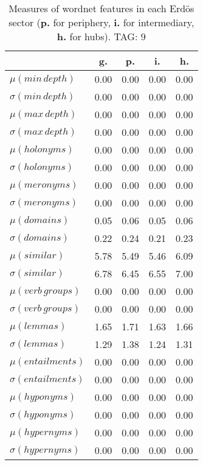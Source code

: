 \begin{table}[h!]
\begin{center}
\begin{tabular}{| l | c | c | c | c |}\hline
 & g. & p. & i. & h. \\\hline
$\mu(min\,depth)$ & 0.00  & 0.00  & 0.00  & 0.00 \\\hline
$\sigma(min\,depth)$ & 0.00  & 0.00  & 0.00  & 0.00 \\\hline
$\mu(max\,depth)$ & 0.00  & 0.00  & 0.00  & 0.00 \\\hline
$\sigma(max\,depth)$ & 0.00  & 0.00  & 0.00  & 0.00 \\\hline
$\mu(holonyms)$ & 0.00  & 0.00  & 0.00  & 0.00 \\\hline
$\sigma(holonyms)$ & 0.00  & 0.00  & 0.00  & 0.00 \\\hline
$\mu(meronyms)$ & 0.00  & 0.00  & 0.00  & 0.00 \\\hline
$\sigma(meronyms)$ & 0.00  & 0.00  & 0.00  & 0.00 \\\hline
$\mu(domains)$ & 0.05  & 0.06  & 0.05  & 0.06 \\\hline
$\sigma(domains)$ & 0.22  & 0.24  & 0.21  & 0.23 \\\hline
$\mu(similar)$ & 5.78  & 5.49  & 5.46  & 6.09 \\\hline
$\sigma(similar)$ & 6.78  & 6.45  & 6.55  & 7.00 \\\hline
$\mu(verb\,groups)$ & 0.00  & 0.00  & 0.00  & 0.00 \\\hline
$\sigma(verb\,groups)$ & 0.00  & 0.00  & 0.00  & 0.00 \\\hline
$\mu(lemmas)$ & 1.65  & 1.71  & 1.63  & 1.66 \\\hline
$\sigma(lemmas)$ & 1.29  & 1.38  & 1.24  & 1.31 \\\hline
$\mu(entailments)$ & 0.00  & 0.00  & 0.00  & 0.00 \\\hline
$\sigma(entailments)$ & 0.00  & 0.00  & 0.00  & 0.00 \\\hline
$\mu(hyponyms)$ & 0.00  & 0.00  & 0.00  & 0.00 \\\hline
$\sigma(hyponyms)$ & 0.00  & 0.00  & 0.00  & 0.00 \\\hline
$\mu(hypernyms)$ & 0.00  & 0.00  & 0.00  & 0.00 \\\hline
$\sigma(hypernyms)$ & 0.00  & 0.00  & 0.00  & 0.00 \\\hline
\end{tabular}
\caption{Measures of wordnet features in each Erd\"os sector ({{\bf p.}} for periphery, {{\bf i.}} for intermediary, {{\bf h.}} for hubs). TAG: 9}
\end{center}
\end{table}